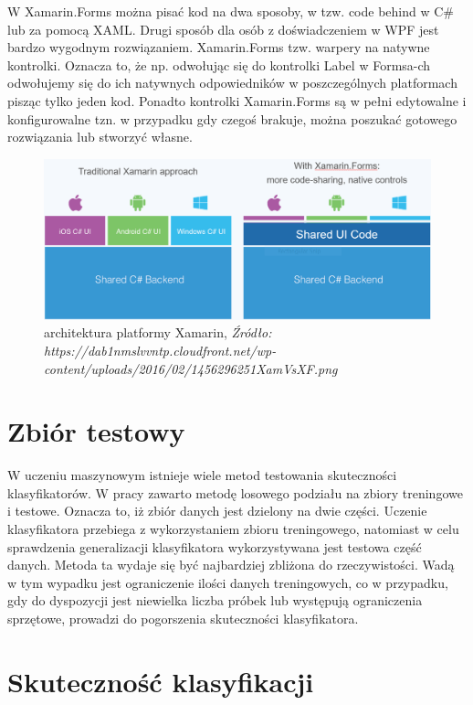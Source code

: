 \documentclass[brudnopis]{xmgr}
\begin{document}
W Xamarin.Forms\cite{6} można pisać kod na dwa sposoby, w tzw. code behind w C\# lub za pomocą XAML. Drugi sposób dla osób z doświadczeniem w WPF jest bardzo wygodnym rozwiązaniem. Xamarin.Forms tzw. warpery na natywne kontrolki. Oznacza to, że np. odwołując się do kontrolki Label w Formsa-ch odwołujemy się do ich natywnych odpowiedników w poszczególnych platformach pisząc tylko jeden kod. Ponadto kontrolki Xamarin.Forms są w pełni edytowalne i konfigurowalne tzn. w przypadku gdy czegoś brakuje, można poszukać gotowego rozwiązania lub stworzyć własne.

\begin{figure}[!tbh]
\centering
\includegraphics[width=1\hsize]{fig/xamarin}
\caption{architektura platformy Xamarin, \emph{Źródło: https://dab1nmslvvntp.cloudfront.net/wp-content/uploads/2016/02/1456296251XamVsXF.png}}
\end{figure}
\newpage

\section{Zbiór testowy}

W uczeniu maszynowym istnieje wiele metod testowania skuteczności klasyfikatorów. W pracy zawarto metodę losowego podziału na zbiory treningowe i testowe. Oznacza to, iż zbiór danych jest dzielony na dwie części. Uczenie klasyfikatora przebiega z wykorzystaniem zbioru treningowego, natomiast w celu sprawdzenia generalizacji klasyfikatora wykorzystywana jest testowa część danych\cite{19}. Metoda ta wydaje się być najbardziej zbliżona do rzeczywistości. Wadą w tym wypadku jest ograniczenie ilości danych treningowych, co w przypadku, gdy do dyspozycji jest niewielka liczba próbek lub występują ograniczenia sprzętowe, prowadzi do pogorszenia skuteczności klasyfikatora.

\section{Skuteczność klasyfikacji}
\end{document}
